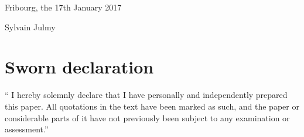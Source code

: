 Fribourg, the 17th January 2017

Sylvain Julmy

\chapter*{Sworn declaration}

`` I hereby solemnly declare that I have personally and independently prepared
this paper. All quotations in the text have been marked as such, and the paper
or considerable parts of it have not previously been subject to any examination
or assessment.''

\listoffigures
\listoflistings

